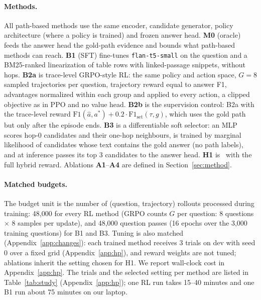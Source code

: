 \paragraph{Methods.}
All path-based methods use the same encoder, candidate generator, policy architecture (where a policy is trained) and frozen answer head.
\textbf{M0} (oracle) feeds the answer head the gold-path evidence and bounds what path-based methods can reach.
\textbf{B1} (SFT) fine-tunes \texttt{flan-t5-small} on the question and a BM25-ranked linearization of table rows with linked-passage snippets, without hops.
\textbf{B2a} is trace-level GRPO-style RL: the same policy and action space, $G=8$ sampled trajectories per question, trajectory reward equal to answer F1, advantages normalized within each group and applied to every action, a clipped objective as in PPO and no value head.
\textbf{B2b} is the supervision control: B2a with the trace-level reward $\mathrm{F1}(\hat a,a^\ast)+0.2\cdot\mathrm{F1}_{\text{set}}(\tau,g)$, which uses the gold path but only after the episode ends.
\textbf{B3} is a differentiable soft selector: an MLP scores hop-0 candidates and their one-hop neighbours, is trained by marginal likelihood of candidates whose text contains the gold answer (no path labels), and at inference passes its top 3 candidates to the answer head.
\textbf{H1} is \hop\ with the full hybrid reward.
Ablations \textbf{A1}--\textbf{A4} are defined in Section~\ref{sec:method}.

\paragraph{Matched budgets.}
The budget unit is the number of (question, trajectory) rollouts processed during training: 48{,}000 for every RL method (GRPO counts $G$ per question: 8 questions $\times$ 8 samples per update), and 48{,}000 question passes (16 epochs over the 3{,}000 training questions) for B1 and B3.
Tuning is also matched (Appendix~\ref{app:changes}): each trained method receives 3 trials on dev with seed 0 over a fixed grid (Appendix~\ref{app:hp}), and reward weights are not tuned; ablations inherit the setting chosen for H1.
We report wall-clock cost in Appendix~\ref{app:hp}.
The trials and the selected setting per method are listed in Table~\ref{tab:study} (Appendix~\ref{app:hp}); one RL run takes 15--40 minutes and one B1 run about 75 minutes on our laptop.

